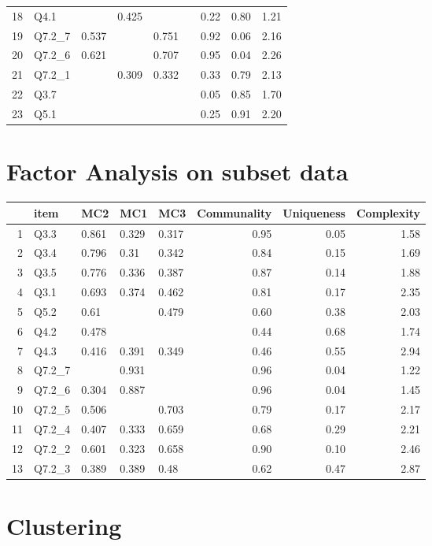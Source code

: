 \documentclass[../main.tex]{subfiles}
\begin{document}
\begin{table}[ht]
\begin{tabular}{rlllllrrr}
                    18 & Q4.1 &  & 0.425 &  &  & 0.22 & 0.80 & 1.21 \\
                    19 & Q7.2\_7 & 0.537 &  & 0.751 &  & 0.92 & 0.06 & 2.16 \\
                    20 & Q7.2\_6 & 0.621 &  & 0.707 &  & 0.95 & 0.04 & 2.26 \\
                    21 & Q7.2\_1 &  & 0.309 & 0.332 &  & 0.33 & 0.79 & 2.13 \\
                    22 & Q3.7 &  &  &  &  & 0.05 & 0.85 & 1.70 \\
                    23 & Q5.1 &  &  &  &  & 0.25 & 0.91 & 2.20 \\
                    \hline
                \end{tabular}
            \end{table}

        \section{Factor Analysis on subset data}

            \begin{table}[ht]
                \centering
                \begin{tabular}{rllllrrr}
                    \hline
                    & item & MC2 & MC1 & MC3 & Communality & Uniqueness & Complexity \\
                    \hline
                    1 & Q3.3 & 0.861 & 0.329 & 0.317 & 0.95 & 0.05 & 1.58 \\
                    2 & Q3.4 & 0.796 & 0.31 & 0.342 & 0.84 & 0.15 & 1.69 \\
                    3 & Q3.5 & 0.776 & 0.336 & 0.387 & 0.87 & 0.14 & 1.88 \\
                    4 & Q3.1 & 0.693 & 0.374 & 0.462 & 0.81 & 0.17 & 2.35 \\
                    5 & Q5.2 & 0.61 &  & 0.479 & 0.60 & 0.38 & 2.03 \\
                    6 & Q4.2 & 0.478 &  &  & 0.44 & 0.68 & 1.74 \\
                    7 & Q4.3 & 0.416 & 0.391 & 0.349 & 0.46 & 0.55 & 2.94 \\
                    8 & Q7.2\_7 &  & 0.931 &  & 0.96 & 0.04 & 1.22 \\
                    9 & Q7.2\_6 & 0.304 & 0.887 &  & 0.96 & 0.04 & 1.45 \\
                    10 & Q7.2\_5 & 0.506 &  & 0.703 & 0.79 & 0.17 & 2.17 \\
                    11 & Q7.2\_4 & 0.407 & 0.333 & 0.659 & 0.68 & 0.29 & 2.21 \\
                    12 & Q7.2\_2 & 0.601 & 0.323 & 0.658 & 0.90 & 0.10 & 2.46 \\
                    13 & Q7.2\_3 & 0.389 & 0.389 & 0.48 & 0.62 & 0.47 & 2.87 \\
                    \hline
                \end{tabular}
            \end{table}

    \section{Clustering}
\end{document}
